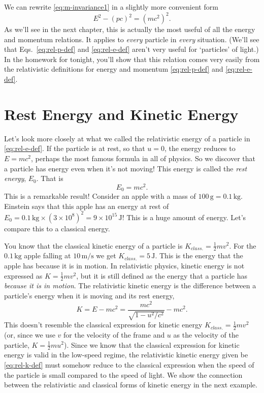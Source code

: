 We can rewrite \eqref{eq:m-invariance1} in a slightly more
convenient form
\begin{equation}
E^2 - (pc)^2 = (mc^2)^2.
\label{eq:m-invariance3}
\end{equation}
As we'll see in the next chapter, this is actually the most useful of
all the energy and momentum relations.  It applies to \emph{every}
particle in \emph{every} situation.  (We'll see that
Eqs.~\eqref{eq:rel-p-def} and \eqref{eq:rel-e-def} aren't very useful
for `particles' of light.)  In the homework for tonight, you'll show
that this relation comes very easily from the relativistic definitions
for energy and momentum \eqref{eq:rel-p-def} and \eqref{eq:rel-e-def}.


\section{Rest Energy and Kinetic Energy}
Let's look more closely at what we called the relativistic energy of a
particle in \eqref{eq:rel-e-def}.  If the particle is at rest, so
that $u = 0$, the energy reduces to $E = mc^2$, perhaps the most famous
formula in all of physics.  So we discover that a particle has energy
even when it's not moving!  This energy is called the \emph{rest energy}, 
$E_0$.  That is
\begin{equation}
E_0 = mc^2.
\label{eq:emc2}
\end{equation}
This is a remarkable result! Consider an apple with a mass of 
$100\,\text{g}=0.1\,\text{kg}$.    Einstein
says that this apple has an energy at rest of $E_0 = 
0.1\,\text{kg}\times (3\times 10^8)^2 = 9\times 10^{15}\,\text{J}$!
This is a huge amount of energy. Let's compare this to a classical 
energy.

You know that the classical kinetic energy of a particle is 
$K_{ class.}  = \frac{1}{2}mv^2$.  For the $0.1\,\text{kg}$ 
apple falling at $10\,\text{m/s}$ we get $K_{ class.} = 5\,\text{J}$.  
This is the energy that the apple has because it is in motion.
In relativistic physics, kinetic energy is not expressed as 
$K = \frac{1}{2}mv^2$,  but it is still defined as the energy that 
a particle has \emph{because it is in motion}.  The relativistic 
kinetic energy is the difference between a particle's energy when 
it is moving and its rest energy, 
\begin{equation}
K = E - mc^2 = \frac{mc^2}{\sqrt{1-u^2/c^2}} - mc^2.
\label{eq:rel-k-def}
\end{equation}
This doesn't resemble the classical expression for kinetic
energy $K_{ class.} = \frac{1}{2}mv^2$ (or, since we
use $v$ for the velocity of the frame and $u$ as the velocity of the
particle, $K = \frac{1}{2}mu^2$).  Since we know that the classical
expression for kinetic energy is valid in the low-speed regime, the
relativistic kinetic energy given be \eqref{eq:rel-k-def} must
somehow reduce to the classical expression when the speed of the
particle is small compared to the speed of light.  We show the
connection between the relativistic and classical forms of kinetic
energy in the next example.

